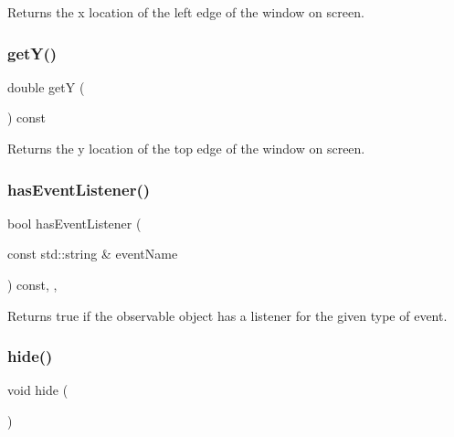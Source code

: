 Returns the x location of the left edge of the window on screen. 

\mbox{\label{classGWindow_aafa51c7f8f38a09febbb9ce7853f77b4}} 
\subsubsection{\texorpdfstring{get\+Y()}{getY()}}
{\footnotesize\ttfamily double getY (\begin{DoxyParamCaption}{ }\end{DoxyParamCaption}) const\hspace{0.3cm}{\ttfamily [virtual]}}



Returns the y location of the top edge of the window on screen. 

\mbox{\label{classGObservable_a9f6faaa25942923bafa1c44020c49fa9}} 
\subsubsection{\texorpdfstring{has\+Event\+Listener()}{hasEventListener()}}
{\footnotesize\ttfamily bool has\+Event\+Listener (\begin{DoxyParamCaption}\item[{const std\+::string \&}]{event\+Name }\end{DoxyParamCaption}) const\hspace{0.3cm}{\ttfamily [protected]}, {\ttfamily [virtual]}, {\ttfamily [inherited]}}



Returns true if the observable object has a listener for the given type of event. 

\mbox{\label{classGWindow_ade42eb4da4eb77db85a8d1e4b92e7be4}} 
\subsubsection{\texorpdfstring{hide()}{hide()}}
{\footnotesize\ttfamily void hide (\begin{DoxyParamCaption}{ }\end{DoxyParamCaption})\hspace{0.3cm}{\ttfamily [virtual]}}



